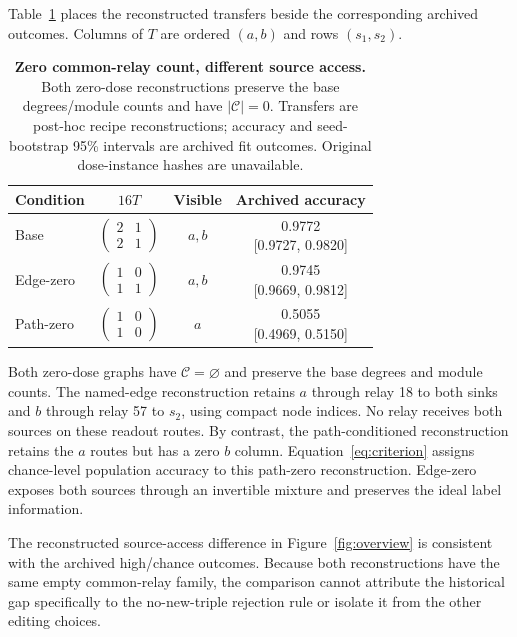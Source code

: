Table~\ref{tab:core} places the reconstructed transfers beside the
corresponding archived outcomes. Columns of $T$ are ordered $(a,b)$ and
rows $(s_1,s_2)$.

\begin{table}[t]
\centering
\caption{\textbf{Zero common-relay count, different source access.}
Both zero-dose reconstructions preserve the base degrees/module counts
and have $|\mathcal C|=0$. Transfers are post-hoc recipe reconstructions;
accuracy and seed-bootstrap 95\% intervals are archived fit outcomes.
Original dose-instance hashes are unavailable.}
\label{tab:core}
\small
\begin{tabular}{@{}lccc@{}}
\toprule
Condition & $16T$ & Visible & Archived accuracy \\
\midrule
Base & $\left(\begin{smallmatrix}2&1\\2&1\end{smallmatrix}\right)$ & $a,b$ &
\shortstack{0.9772\\{[0.9727, 0.9820]}} \\[6pt]
Edge-zero & $\left(\begin{smallmatrix}1&0\\1&1\end{smallmatrix}\right)$ & $a,b$ &
\shortstack{0.9745\\{[0.9669, 0.9812]}} \\[6pt]
Path-zero & $\left(\begin{smallmatrix}1&0\\1&0\end{smallmatrix}\right)$ & $a$ &
\shortstack{0.5055\\{[0.4969, 0.5150]}} \\
\bottomrule
\end{tabular}
\end{table}

Both zero-dose graphs have $\mathcal C=\varnothing$ and preserve the
base degrees and module counts. The named-edge reconstruction retains
$a$ through relay 18 to both sinks and $b$ through relay 57 to $s_2$,
using compact node indices. No relay receives both sources on these
readout routes. By contrast, the path-conditioned reconstruction retains
the $a$ routes but has a zero $b$ column. Equation~\eqref{eq:criterion} assigns chance-level population accuracy
to this path-zero reconstruction. Edge-zero exposes both sources through
an invertible mixture and preserves the ideal label information.

The reconstructed source-access difference in Figure~\ref{fig:overview}
is consistent with the archived high/chance outcomes. Because both
reconstructions have the same empty common-relay family, the comparison
cannot attribute the historical gap specifically to the no-new-triple
rejection rule or isolate it from the other editing choices.

